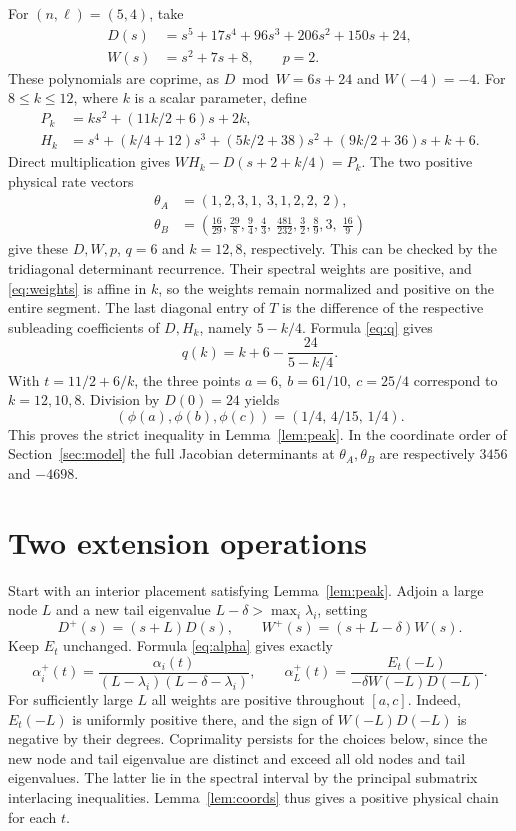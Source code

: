 \documentclass[11pt,a4paper]{article}
\begin{document}
For \((n,\ell)=(5,4)\), take
\begin{align*}
 D(s)&=s^5+17s^4+96s^3+206s^2+150s+24,\\
 W(s)&=s^2+7s+8,\qquad p=2.
\end{align*}
These polynomials are coprime, as \(D\bmod W=6s+24\) and \(W(-4)=-4\).
For \(8\le k\le12\), where \(k\) is a scalar parameter, define
\begin{align*}
 P_k&=ks^2+(11k/2+6)s+2k,\\
 H_k&=s^4+(k/4+12)s^3+(5k/2+38)s^2+(9k/2+36)s+k+6.
\end{align*}
Direct multiplication gives
\(WH_k-D(s+2+k/4)=P_k\). The two positive physical rate vectors
\begin{align}
 \theta_A&=(1,2,3,1,\ 3,1,2,2,\ 2),\nonumber\\
 \theta_B&=\left(\tfrac{16}{29},\tfrac{29}{8},\tfrac94,\tfrac43,\
                 \tfrac{481}{232},\tfrac32,\tfrac89,3,\ \tfrac{16}{9}\right)
                 \label{eq:seed}
\end{align}
give these \(D,W,p\), \(q=6\) and \(k=12,8\), respectively. This can be
checked by the tridiagonal determinant recurrence. Their spectral weights
are positive, and \eqref{eq:weights} is affine in \(k\), so the weights
remain normalized and positive on the entire segment. The last diagonal
entry of \(T\) is the difference of the respective subleading coefficients
of \(D,H_k\), namely \(5-k/4\). Formula \eqref{eq:q} gives
\[
 q(k)=k+6-\frac{24}{5-k/4}.
\]
With \(t=11/2+6/k\), the three points \(a=6,\ b=61/10,\ c=25/4\)
correspond to \(k=12,10,8\). Division by \(D(0)=24\) yields
\[
 (\phi(a),\phi(b),\phi(c))=(1/4,\,4/15,\,1/4).
\]
This proves the strict inequality in Lemma~\ref{lem:peak}. In the coordinate
order of Section~\ref{sec:model} the full Jacobian determinants at \(\theta_A,\theta_B\)
are respectively \(3456\) and \(-4698\).

\section{Two extension operations}
Start with an interior placement satisfying Lemma~\ref{lem:peak}. Adjoin a
large node \(L\) and a new tail eigenvalue \(L-\delta>\max_i\lambda_i\), setting
\[
 D^+(s)=(s+L)D(s),\qquad W^+(s)=(s+L-\delta)W(s).
\]
Keep \(E_t\) unchanged. Formula \eqref{eq:alpha} gives exactly
\begin{equation}\label{eq:extend}
 \alpha_i^+(t)=\frac{\alpha_i(t)}
 {(L-\lambda_i)(L-\delta-\lambda_i)},\qquad
 \alpha_L^+(t)=\frac{E_t(-L)}{-\delta W(-L)D(-L)} .
\end{equation}
For sufficiently large \(L\) all weights are positive throughout \([a,c]\).
Indeed, \(E_t(-L)\) is uniformly positive there, and the sign of
\(W(-L)D(-L)\) is negative by their degrees. Coprimality persists for the
choices below, since the new node and tail eigenvalue are distinct and exceed all
old nodes and tail eigenvalues. The latter lie in the spectral interval by
the principal submatrix interlacing inequalities. Lemma~\ref{lem:coords}
thus gives a positive physical chain for each \(t\).
\end{document}
